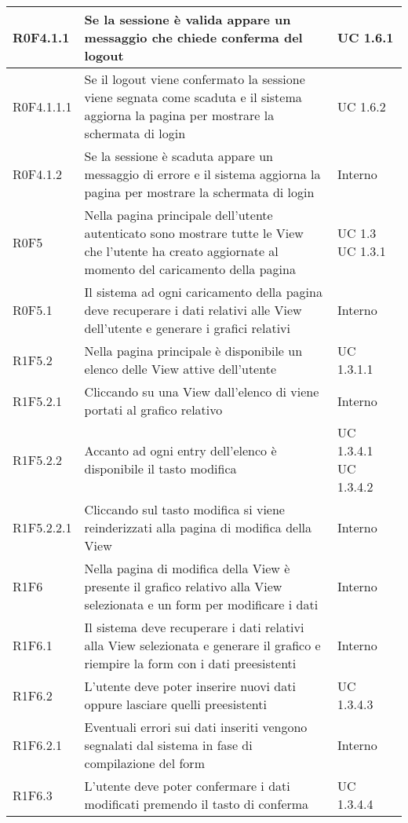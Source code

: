 \begin{center}
\begin{longtable}{| p{2cm} | p{8cm} | p{2cm} |}
		\hline
		R0F4.1.1  &  Se la sessione è valida appare un messaggio che chiede conferma del logout  &  UC 1.6.1 \\
		\hline
		R0F4.1.1.1  &  Se il logout viene confermato la sessione viene segnata come scaduta e il sistema aggiorna la pagina per mostrare la schermata di login  &  UC 1.6.2 \\
		\hline
		R0F4.1.2  &  Se la sessione è scaduta appare un messaggio di errore e il sistema aggiorna la pagina per mostrare la schermata di login  &  Interno \\
		\hline
		R0F5  &  Nella pagina principale dell'utente autenticato sono mostrare tutte le View che l'utente ha creato aggiornate al momento del caricamento della pagina &  UC 1.3 \newline UC 1.3.1 \\
		\hline
		R0F5.1  &  Il sistema ad ogni caricamento della pagina deve recuperare i dati relativi alle View dell'utente e generare i grafici relativi  &  Interno \\
		\hline
		R1F5.2  &  Nella pagina principale è disponibile un elenco delle View attive dell'utente  &  UC 1.3.1.1 \\
		\hline
		R1F5.2.1  &  Cliccando su una View dall'elenco di viene portati al grafico relativo  &  Interno \\
		\hline
		R1F5.2.2  &  Accanto ad ogni entry dell'elenco è disponibile il tasto modifica  &  UC 1.3.4.1 \newline UC 1.3.4.2 \\
		\hline
		R1F5.2.2.1  &  Cliccando sul tasto modifica si viene reinderizzati alla pagina di modifica della View  &  Interno \\
		\hline
		R1F6  &  Nella pagina di modifica della View è presente il grafico relativo alla View selezionata e un form per modificare i dati  &  Interno \\
		\hline
		R1F6.1  &  Il sistema deve recuperare i dati relativi alla View selezionata e generare il grafico e riempire la form con i dati preesistenti  &  Interno \\
		\hline
		R1F6.2  &  L'utente deve poter inserire nuovi dati oppure lasciare quelli preesistenti  &  UC 1.3.4.3 \\
		\hline
		R1F6.2.1  &  Eventuali errori sui dati inseriti vengono segnalati dal sistema in fase di compilazione del form  &  Interno \\
		\hline
		R1F6.3  &  L'utente deve poter confermare i dati modificati premendo il tasto di conferma  &  UC 1.3.4.4 \\

\end{longtable}
\end{center}
